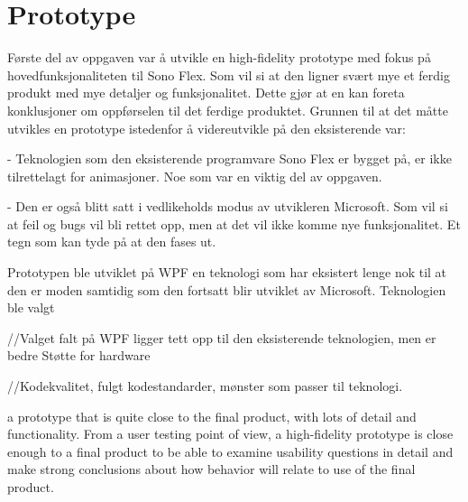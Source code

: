 \section{Prototype}

Første del av oppgaven var å utvikle en high-fidelity prototype med fokus på hovedfunksjonaliteten til Sono Flex. Som vil si at den ligner svært mye et ferdig produkt med mye detaljer og funksjonalitet. Dette gjør at en kan foreta konklusjoner om oppførselen til det ferdige produktet. Grunnen til at det måtte utvikles en prototype istedenfor å videreutvikle på den eksisterende var:

- Teknologien som den eksisterende programvare Sono Flex er bygget på, er ikke tilrettelagt for animasjoner. Noe som var en viktig del av oppgaven.

- Den er også blitt satt i vedlikeholds modus av utvikleren Microsoft. Som vil si at feil og bugs vil bli rettet opp, men at det vil ikke komme nye funksjonalitet. Et tegn som kan tyde på at den fases ut.

Prototypen ble utviklet på WPF en teknologi som har eksistert lenge nok til at den er moden samtidig som den fortsatt blir utviklet av Microsoft. Teknologien ble valgt 







//Valget falt på WPF ligger tett opp til den eksisterende teknologien, men er bedre Støtte for hardware

//Kodekvalitet, fulgt kodestandarder, mønster som passer til teknologi. 


a prototype that is quite close to the final product, with lots of detail and functionality. From a user testing point of view, a high-fidelity prototype is close enough to a final product to be able to examine usability questions in detail and make strong conclusions about how behavior will relate to use of the final product.